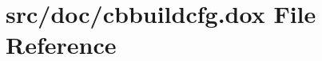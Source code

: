 \hypertarget{cbbuildcfg_8dox}{\section{src/doc/cbbuildcfg.dox File Reference}
\label{cbbuildcfg_8dox}
}
